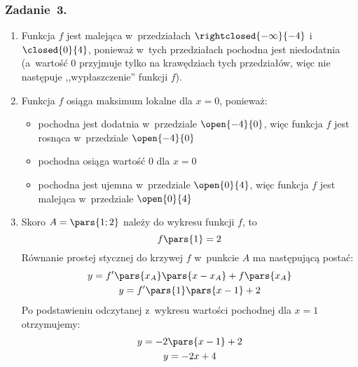 \subsubsection*{Zadanie~3.}
\begin{enumerate}[label={\alph*)}]
    \item Funkcja \(f\) jest malejąca w~przedziałach \(\rightclosed{-\infty}{-4}\) i~\(\closed{0}{4}\), ponieważ w~tych przedziałach pochodna jest niedodatnia (a~wartość \(0\) przyjmuje tylko na krawędziach tych przedziałów, więc nie następuje ,,wypłaszczenie'' funkcji \(f\)).
    \item Funkcja \(f\) osiąga maksimum lokalne dla \(x = 0\), ponieważ:
        \begin{itemize}
            \item pochodna jest dodatnia w~przedziale \(\open{-4}{0}\), więc funkcja \(f\) jest rosnąca w~przedziale \(\open{-4}{0}\)
            \item pochodna osiąga wartość \(0\) dla \(x = 0\)
            \item pochodna jest ujemna w~przedziale \(\open{0}{4}\), więc funkcja \(f\) jest malejąca w~przedziale \(\open{0}{4}\)
        \end{itemize}
    \item Skoro \(A = \pars{1; 2}\) należy do wykresu funkcji \(f\), to
        \begin{equation*}
            f\pars{1} = 2
        \end{equation*}
        Równanie prostej stycznej do krzywej \(f\) w~punkcie \(A\) ma następującą postać:
        \begin{gather*}
            y = f'\pars{x_A}\pars{x - x_A} + f\pars{x_A}\\
            y = f'\pars{1}\pars{x - 1} + 2
        \end{gather*}
        Po podstawieniu odczytanej z~wykresu wartości pochodnej dla \(x = 1\) otrzymujemy:
        \begin{gather*}
            y = -2\pars{x - 1} + 2\\
            y = -2x + 4
        \end{gather*}
\end{enumerate}
